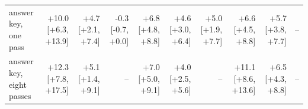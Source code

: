 \begin{table}[tbp]
{\begin{tabular}{lrrrrrrrrr}
answer key, one pass & +10.0 {\scriptsize[+6.3, +13.9]} & +4.7 {\scriptsize[+2.1, +7.4]} & -0.3 {\scriptsize[-0.7, +0.0]} & +6.8 {\scriptsize[+4.8, +8.8]} & +4.6 {\scriptsize[+3.0, +6.4]} & +5.0 {\scriptsize[+1.9, +7.7]} & +6.6 {\scriptsize[+4.5, +8.8]} & +5.7 {\scriptsize[+3.8, +7.7]} & -- \\
answer key, eight passes & +12.3 {\scriptsize[+7.8, +17.5]} & +5.1 {\scriptsize[+1.4, +9.1]} & -- & +7.0 {\scriptsize[+5.0, +9.1]} & +4.0 {\scriptsize[+2.5, +5.6]} & -- & +11.1 {\scriptsize[+8.6, +13.6]} & +6.5 {\scriptsize[+4.3, +8.8]} & -- \\
\bottomrule
\end{tabular}}
\end{table}
